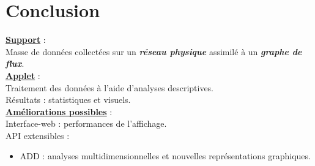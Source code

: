	\section{Conclusion}
		\begin{frame}
			\underline{\textbf{Support}} :\\
				\hspace{1em}Masse de données collectées sur un \textbf{\textit{réseau physique}} assimilé à un \textbf{\textit{graphe de flux}}.\\
			\vspace{1em}
			\underline{\textbf{Applet}} :\\
				\hspace{1em}Traitement des données à l'aide d'analyses descriptives.\\
				\hspace{1em}Résultats : statistiques et visuels.\\
			\vspace{1em}
			\underline{\textbf{Améliorations possibles}} :\\
				\hspace{1em}Interface-web : performances de l'affichage.\\
				\hspace{1em}API extensibles :
					\hspace{1em}\begin{itemize}\item ADD : analyses multidimensionnelles et nouvelles représentations graphiques.\end{itemize}
		\end{frame}
	

